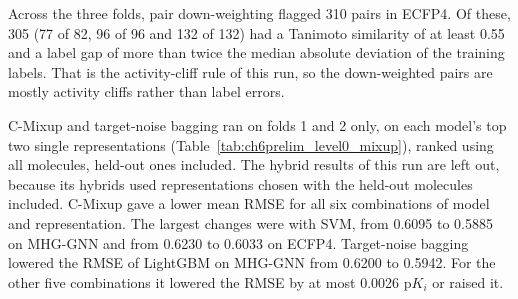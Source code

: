 Across the three folds, pair down-weighting flagged 310 pairs in ECFP4. Of these, 305 (77 of 82, 96 of 96 and 132 of 132) had a Tanimoto similarity of at least 0.55 and a label gap of more than twice the median absolute deviation of the training labels. That is the activity-cliff rule of this run, so the down-weighted pairs are mostly activity cliffs rather than label errors.

C-Mixup and target-noise bagging ran on folds 1 and 2 only, on each model's top two single representations (Table~\ref{tab:ch6prelim_level0_mixup}), ranked using all molecules, held-out ones included. The hybrid results of this run are left out, because its hybrids used representations chosen with the held-out molecules included. C-Mixup gave a lower mean RMSE for all six combinations of model and representation. The largest changes were with SVM, from 0.6095 to 0.5885 on MHG-GNN and from 0.6230 to 0.6033 on ECFP4. Target-noise bagging lowered the RMSE of LightGBM on MHG-GNN from 0.6200 to 0.5942. For the other five combinations it lowered the RMSE by at most 0.0026 p$K_i$ or raised it.

